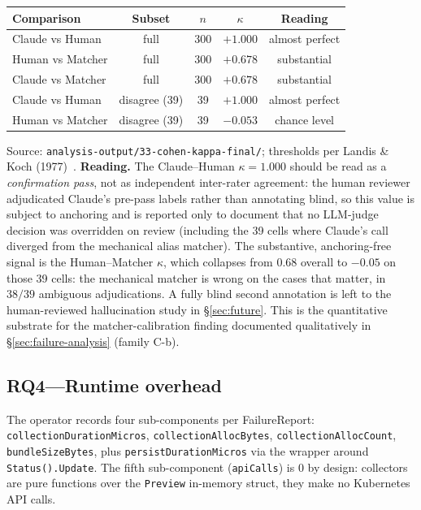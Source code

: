 \documentclass[sigconf, nonacm=true, anonymous=false, review=false]{acmart}
\newcommand{\RQ}[1]{RQ#1\xspace}
\newcommand{\fp}{FailureReport\xspace}
\begin{document}
\begin{center}
\scriptsize
\begin{tabular}{l c c c c}
\toprule
\textbf{Comparison} & \textbf{Subset} & \boldmath$n$ & \boldmath$\kappa$ & \textbf{Reading} \\
\midrule
Claude vs Human   & full         & 300 & $+1.000$ & almost perfect \\
Human  vs Matcher & full         & 300 & $+0.678$ & substantial    \\
Claude vs Matcher & full         & 300 & $+0.678$ & substantial    \\
\midrule
Claude vs Human   & disagree (39) & 39  & $+1.000$ & almost perfect \\
Human  vs Matcher & disagree (39) & 39  & $-0.053$ & chance level   \\
\bottomrule
\end{tabular}
\end{center}

Source: \texttt{analysis-output/33-cohen-kappa-final/}; thresholds
per Landis \& Koch (1977)~\cite{mchugh_kappa_2012,
inter_coder_se_2023}. \textbf{Reading.} The Claude--Human $\kappa = 1.000$ should be read as
a \emph{confirmation pass}, not as independent inter-rater agreement:
the human reviewer adjudicated Claude's pre-pass labels rather than
annotating blind, so this value is subject to anchoring and is
reported only to document that no LLM-judge decision was overridden on
review (including the 39 cells where Claude's call diverged from the
mechanical alias matcher). The substantive, anchoring-free signal is
the Human--Matcher $\kappa$, which collapses from $0.68$ overall to
$-0.05$ on those 39 cells: the mechanical matcher is wrong on the
cases that matter, in $38/39$ ambiguous adjudications. A fully blind
second annotation is left to the human-reviewed hallucination study in
\S\ref{sec:future}. This is the
quantitative substrate for the matcher-calibration finding
documented qualitatively in
\S\ref{sec:failure-analysis} (family C-b).

\subsection{\RQ{4}---Runtime overhead}
\label{sec:rq4-overhead}

The operator records four sub-components per \fp{}:
\texttt{collectionDurationMicros}, \texttt{collectionAllocBytes},
\texttt{collectionAllocCount}, \texttt{bundleSizeBytes}, plus
\texttt{persistDurationMicros} via the wrapper around
\texttt{Status().Update}. The fifth sub-component (\texttt{apiCalls})
is 0 by design: collectors are pure functions over the
\texttt{Preview} in-memory struct, they make no Kubernetes API calls.
\end{document}

